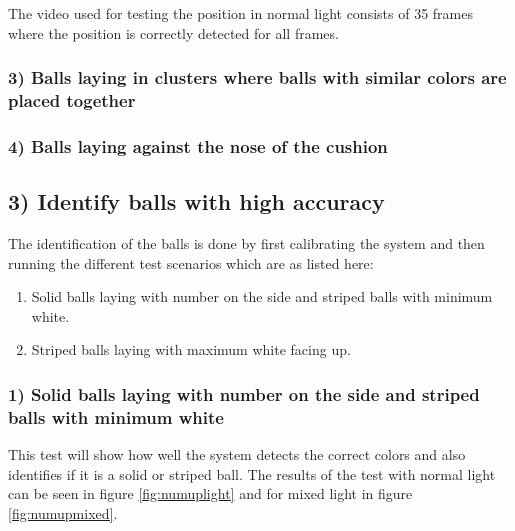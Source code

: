 The video used for testing the position in normal light consists of 35 frames where the position is correctly detected for all frames.

\subsubsection{ 3) Balls laying in clusters where balls with similar colors are placed together}


\subsubsection{ 4) Balls laying against the nose of the cushion}


\subsection{3) Identify balls with high accuracy}

The identification of the balls is done by first calibrating the system and then running the different test scenarios which are as listed here:

\begin{enumerate}
\setlength{\itemsep}{0mm}
	\item Solid balls laying with number on the side and striped balls with minimum white.\\
	\item Striped balls laying with maximum white facing up.\\	
\end{enumerate}

\subsubsection{1) Solid balls laying with number on the side and striped balls with minimum white}
This test will show how well the system detects the correct colors and also identifies if it is a solid or striped ball. The results of the test with normal light can be seen in figure \ref{fig:numuplight} and for mixed light in figure \ref{fig:numupmixed}.


